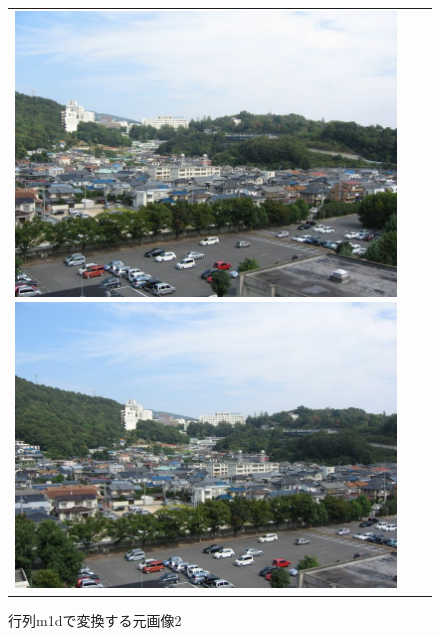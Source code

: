 \documentclass[a4j]{jarticle}
\begin{document}
\begin{figure}[htbp]
\begin{tabular}{ccc}
\begin{minipage}{0.3\hsize}
\center
\includegraphics[bb=0 0 768 576,scale=.15]{0.jpg}
\caption{行列m0dで変換する元画像1}
\end{minipage}
\begin{minipage}{0.3\hsize}
\center
\includegraphics[bb=0 0 768 576,scale=.15]{1.jpg}
\caption{行列m1dで変換する元画像2}
\end{minipage}
\begin{minipage}{0.4\hsize}
\center

\end{minipage}
\end{tabular}
\end{figure}
\end{document}
